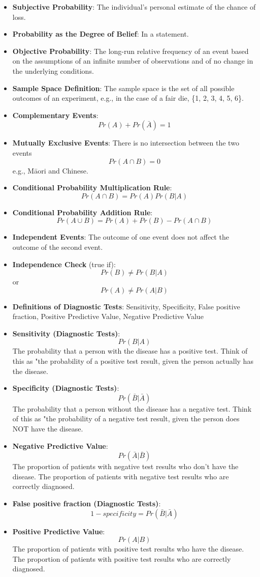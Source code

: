 \documentclass[12pt]{book}
\begin{document}
\begin{itemize}
\item \textbf{Subjective Probability}: The individual's personal estimate of the chance of loss.
\item \textbf{Probability as the Degree of Belief}: In a statement.
\item \textbf{Objective Probability}: The long-run relative frequency of an event based on the assumptions of an infinite number of observations and of no change in the underlying conditions.
\item \textbf{Sample Space Definition}: The sample space is the set of all possible outcomes of an experiment, e.g., in the case of a fair die, \{1, 2, 3, 4, 5, 6\}.
\item \textbf{Complementary Events}: $$Pr(A) + Pr(\bar{A}) = 1$$
\item \textbf{Mutually Exclusive Events}: There is no intersection between the two events $$Pr(A \cap B) = 0$$ e.g., Māori and Chinese.
\item \textbf{Conditional Probability Multiplication Rule}: $$Pr(A \cap B) = Pr(A) Pr(B|A)$$
\item \textbf{Conditional Probability Addition Rule}: $$Pr(A \cup B) = Pr(A) + Pr(B) - Pr(A \cap B)$$
\item \textbf{Independent Events}: The outcome of one event does not affect the outcome of the second event.
\item \textbf{Independence Check} (true if): $$Pr(B) \neq Pr(B | A)$$ or $$Pr(A) \neq Pr(A | B)$$
\item \textbf{Definitions of Diagnostic Tests}: Sensitivity, Specificity, False positive fraction, Positive Predictive Value, Negative Predictive Value
\item \textbf{Sensitivity (Diagnostic Tests)}: $$Pr(B | A)$$ The probability that a person with the disease has a positive test. Think of this as "the probability of a positive test result, given the person actually has the disease.
\item \textbf{Specificity (Diagnostic Tests)}: $$Pr(\bar{B} | \bar{A})$$ The probability that a person without the disease has a negative test. Think of this as "the probability of a negative test result, given the person does NOT have the disease.
\item \textbf{Negative Predictive Value}: $$Pr(\bar{A} | \bar{B})$$ The proportion of patients with negative test results who don't have the disease. The proportion of patients with negative test results who are correctly diagnosed.
\item \textbf{False positive fraction (Diagnostic Tests)}: $$1 - specificity = Pr(\bar{B} | \bar{A})$$
\item \textbf{Positive Predictive Value}: $$Pr(A | B)$$ The proportion of patients with positive test results who have the disease. The proportion of patients with positive test results who are correctly diagnosed.
\end{itemize}
\end{document}
